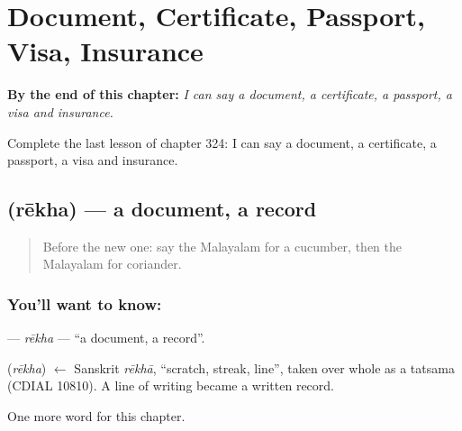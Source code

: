 
\chapter{Document, Certificate, Passport, Visa, Insurance}
\label{ch:ml-document-certificate-passport-visa-insurance}

\begin{chapteropening}
\textbf{By the end of this chapter:} \emph{I can say a document, a certificate, a passport, a visa and insurance.}

Complete the last lesson of chapter 324: I can say a document, a certificate, a passport, a visa and insurance.
\end{chapteropening}

\section[\texorpdfstring{\ml{രേഖ} (rēkha)}{രേഖ (rēkha)}]{ (rēkha) — a document, a record}

\label{lesson:ML-C324-rekha}



\begin{quote}
Before the new one: say the Malayalam for a cucumber, then the Malayalam for coriander.
\end{quote}

\subsection*{You'll want to know: }
\textbf{} — \emph{rēkha} — \textquotedblleft{}a document, a record\textquotedblright{}.

\begin{cousinweb}
\textbf{} (\emph{rēkha}) $\leftarrow$ Sanskrit \emph{rēkhā}, \textquotedblleft{}scratch, streak, line\textquotedblright{}, taken over whole as a tatsama (CDIAL 10810). A line of writing became a written record.
\end{cousinweb}

\begin{grammarlens}[title={What you've built}]
One more word for this chapter.
\end{grammarlens}

